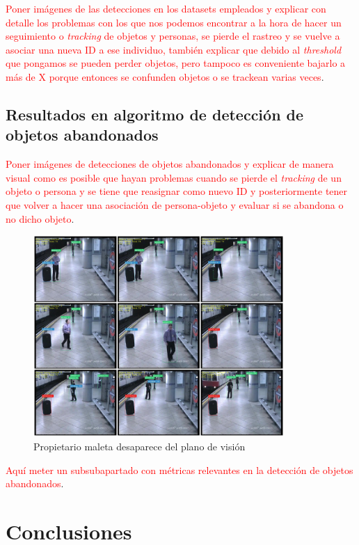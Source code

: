 \textcolor{red}{Poner imágenes de las detecciones en los datasets empleados y explicar con detalle los problemas con los que nos podemos encontrar a la hora de hacer un seguimiento o \textit{tracking} de objetos y personas, se pierde el rastreo y se vuelve a asociar una nueva ID a ese individuo, también explicar que debido al \textit{threshold} que pongamos se pueden perder objetos, pero tampoco es conveniente bajarlo a más de X porque entonces se confunden objetos o se trackean varias veces}.

\newpage

\subsection{Resultados en algoritmo de detección de objetos abandonados}
\label{subsec:resultados-abandon-algorithm}

\textcolor{red}{Poner imágenes de detecciones de objetos abandonados y explicar de manera visual como es posible que hayan problemas cuando se pierde el \textit{tracking} de un objeto o persona y se tiene que reasignar como nuevo ID y posteriormente tener que volver a hacer una asociación de persona-objeto y evaluar si se abandona o no dicho objeto}.

\begin{figure}[ht]
\centering
\includegraphics[width=0.85\textwidth]{img/chapters/resultados/abandono/abandoned-avssab2007-example2.png}
\caption{\label{fig:propietario-desaparece-plano}Propietario maleta desaparece del plano de visión}
\end{figure}

\textcolor{red}{Aquí meter un subsubapartado con métricas relevantes en la detección de objetos abandonados}.

\newpage

\section{Conclusiones}
\label{sec:conclu-resultados}

